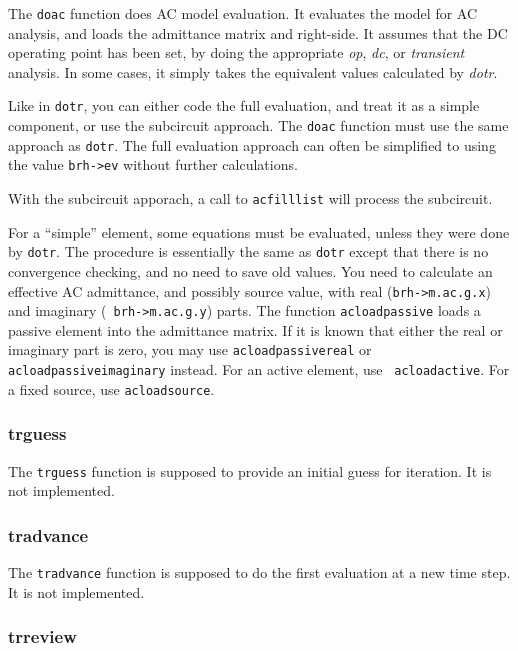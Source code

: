 The {\tt doac} function does AC model evaluation.  It evaluates the model
for AC analysis, and loads the admittance matrix and right-side.  It assumes
that the DC operating point has been set, by doing the appropriate {\em op},
{\em dc}, or {\em transient} analysis.  In some cases, it simply takes the
equivalent values calculated by {\em dotr}.

Like in {\tt dotr}, you can either code the full evaluation, and treat it as
a simple component, or use the subcircuit approach.  The {\tt doac} function
must use the same approach as {\tt dotr}.  The full evaluation approach can
often be simplified to using the value {\tt brh->ev} without further
calculations.

With the subcircuit apporach, a call to {\tt acfilllist} will process the
subcircuit.

For a ``simple'' element, some equations must be evaluated, unless they were
done by {\tt dotr}.  The procedure is essentially the same as {\tt dotr}
except that there is no convergence checking, and no need to save old
values.  You need to calculate an effective AC admittance, and possibly
source value, with real ({\tt brh->m.ac.g.x}) and imaginary ({\tt
brh->m.ac.g.y}) parts.  The function {\tt acloadpassive} loads a passive
element into the admittance matrix.  If it is known that either the real or
imaginary part is zero, you may use {\tt acloadpassivereal} or {\tt
acloadpassiveimaginary} instead.  For an active element, use {\tt
acloadactive}.  For a fixed source, use {\tt acloadsource}.
\subsubsection{trguess}

The {\tt trguess} function is supposed to provide an initial guess for
iteration.  It is not implemented.
\subsubsection{tradvance}

The {\tt tradvance} function is supposed to do the first evaluation at a new
time step.  It is not implemented.
\subsubsection{trreview}

